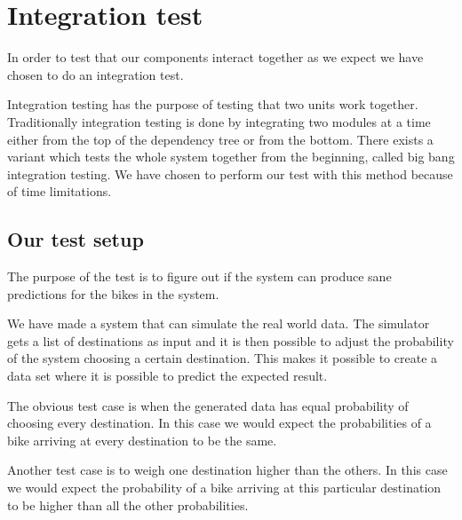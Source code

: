 \section{Integration test}

In order to test that our components interact together as we expect we have chosen to do an integration test.

Integration testing has the purpose of testing that two units work together. 
Traditionally integration testing is done by integrating two modules at a time either from the top of the dependency tree or from the bottom.
There exists a variant which tests the whole system together from the beginning, called big bang integration testing.
We have chosen to perform our test with this method because of time limitations. \cite{inttest}

\subsection{Our test setup}
The purpose of the test is to figure out if the system can produce sane predictions for the bikes in the system.


We have made a system that can simulate the real world data. 
The simulator gets a list of destinations as input and it is then possible to adjust the probability of the system choosing a certain destination. 
This makes it possible to create a data set where it is possible to predict the expected result.

The obvious test case is when the generated data has equal probability of choosing every destination. 
In this case we would expect the probabilities of a bike arriving at every destination to be the same.

Another test case is to weigh one destination higher than the others.
In this case we would expect the probability of a bike arriving at this particular destination to be higher than all the other probabilities.